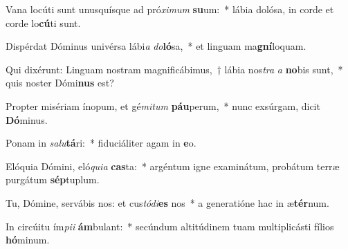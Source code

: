 \item Vana locúti sunt unusquísque ad pró\textit{xi}\textit{mum} \textbf{su}um:~* lábia dolósa, in corde et corde lo\textbf{cú}ti sunt.
\item Dispérdat Dóminus univérsa lábi\textit{a} \textit{do}\textbf{ló}sa,~* et linguam ma\textbf{gní}loquam.
\item Qui dixérunt: Linguam nostram magnificábimus,~† lábia nos\textit{tra} \textit{a} \textbf{no}bis sunt,~* quis noster Dómi\textbf{nus} est?
\item Propter misériam ínopum, et gé\textit{mi}\textit{tum} \textbf{páu}perum,~* nunc exsúrgam, dicit \textbf{Dó}minus.
\item Ponam in \textit{sa}\textit{lu}\textbf{tá}ri:~* fiduciáliter agam in \textbf{e}o.
\item Elóquia Dómini, eló\textit{qui}\textit{a} \textbf{cas}ta:~* argéntum igne examinátum, probátum terræ purgátum \textbf{sép}tuplum.
\item Tu, Dómine, servábis nos: et cus\textit{tó}\textit{di}\textbf{es} nos~* a generatióne hac in æ\textbf{tér}num.
\item In circúitu ím\textit{pi}\textit{i} \textbf{ám}bulant:~* secúndum altitúdinem tuam multiplicásti fílios \textbf{hó}minum.

